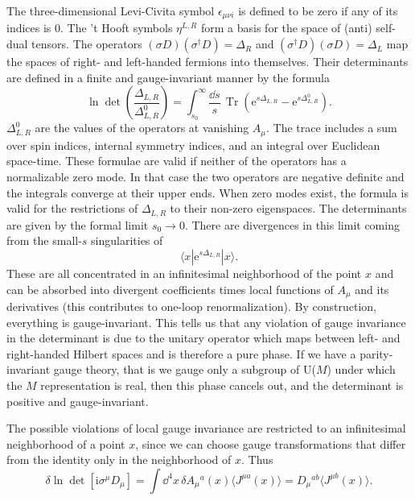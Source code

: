 The three-dimensional Levi-Civita symbol $\epsilon_{\mu\nu i}$ is defined to
be zero if any of its indices is 0. The 't Hooft symbols $\eta^{L,R}$ form a
basis for the space of (anti) self-dual tensors. The operators
$(\sigma D)(\sigma^\dagger D)=\Delta_R$ and
$(\sigma^\dagger D)(\sigma D)=\Delta_L$ map the spaces of right- and
left-handed fermions into themselves. Their determinants are defined in a
finite and gauge-invariant manner by the formula
\[
  \ln\det\left(\frac{\Delta_{L,R}}{\Delta^0_{L,R}}\right)
  =\int_{s_0}^{\infty}\frac{\dd s}{s}\,
    \operatorname{Tr}\left(\mathrm{e}^{s\Delta_{L,R}}
    -\mathrm{e}^{s\Delta^0_{L,R}}\right).
\]
$\Delta^0_{L,R}$ are the values of the operators at vanishing $A_\mu$. The
trace includes a sum over spin indices, internal symmetry indices, and an
integral over Euclidean space-time. These formulae are valid if neither of the
operators has a normalizable zero mode. In that case the two operators are
negative definite and the integrals converge at their upper ends. When zero
modes exist, the formula is valid for the restrictions of $\Delta_{L,R}$ to
their non-zero eigenspaces. The determinants are given by the formal limit
$s_0\to0$. There are divergences in this limit coming from the small-$s$
singularities of
\[
  \langle x|\mathrm{e}^{s\Delta_{L,R}}|x\rangle .
\]
These are all concentrated in an infinitesimal neighborhood of the point $x$
and can be absorbed into divergent coefficients times local functions of
$A_\mu$ and its derivatives (this contributes to one-loop renormalization).
By construction, everything is gauge-invariant. This tells us that any
violation of gauge invariance in the determinant is due to the unitary
operator which maps between left- and right-handed Hilbert spaces and is
therefore a pure phase. If we have a parity-invariant gauge theory, that is we
gauge only a subgroup of U($M$) under which the $M$ representation is real,
then this phase cancels out, and the determinant is positive and
gauge-invariant.

The possible violations of local gauge invariance are restricted to an
infinitesimal neighborhood of a point $x$, since we can choose gauge
transformations that differ from the identity only in the neighborhood of
$x$. Thus
\[
  \delta\ln\det[\mathrm{i}\sigma^\mu D_\mu]
  =\int\!\dd^4x\,\delta A_\mu{}^a(x)\langle J^{\mu a}(x)\rangle
  =D_\mu{}^{ab}\langle J^{\mu b}(x)\rangle .
\]

